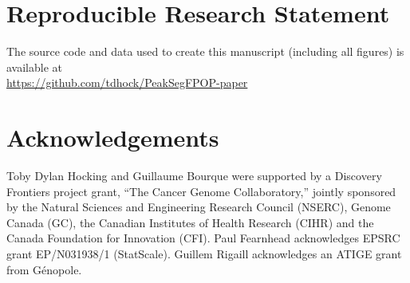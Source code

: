 \documentclass[twoside,11pt]{article}
\begin{document}
\section{Reproducible Research Statement}

The source code and data used to create this manuscript (including all
figures) is available at\\
\url{https://github.com/tdhock/PeakSegFPOP-paper}


\section{Acknowledgements}
  
Toby Dylan Hocking and Guillaume Bourque were supported by a Discovery
Frontiers project grant, ``The Cancer Genome Collaboratory,'' jointly
sponsored by the Natural Sciences and Engineering Research Council
(NSERC), Genome Canada (GC), the Canadian Institutes of Health
Research (CIHR) and the Canada Foundation for Innovation (CFI). Paul
Fearnhead acknowledges EPSRC grant EP/N031938/1 (StatScale).
Guillem Rigaill acknowledges an ATIGE grant from G\'enopole.





 


\end{document}
